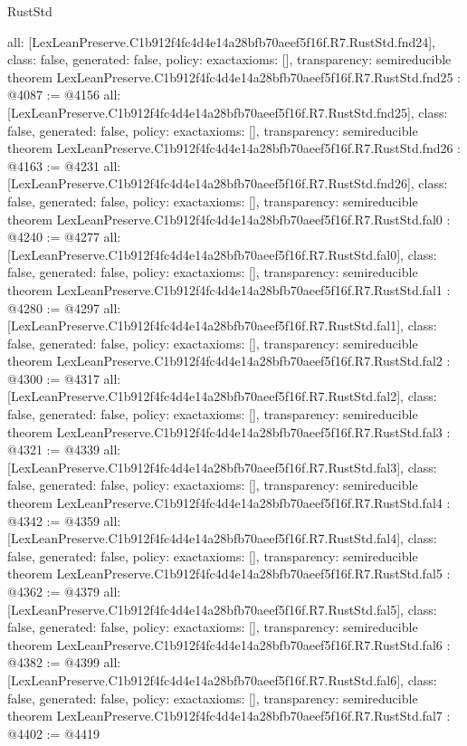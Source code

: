 \begin{lexlean}{RustStd}
\begin{coremodule}
{  all: [LexLeanPreserve.C1b912f4fc4d4e14a28bfb70aeef5f16f.R7.RustStd.fnd24],
  class: false,
  generated: false,
  policy: exact{axioms: []},
  transparency: semireducible
}
theorem LexLeanPreserve.C1b912f4fc4d4e14a28bfb70aeef5f16f.R7.RustStd.fnd25 : @4087 := @4156 {
  all: [LexLeanPreserve.C1b912f4fc4d4e14a28bfb70aeef5f16f.R7.RustStd.fnd25],
  class: false,
  generated: false,
  policy: exact{axioms: []},
  transparency: semireducible
}
theorem LexLeanPreserve.C1b912f4fc4d4e14a28bfb70aeef5f16f.R7.RustStd.fnd26 : @4163 := @4231 {
  all: [LexLeanPreserve.C1b912f4fc4d4e14a28bfb70aeef5f16f.R7.RustStd.fnd26],
  class: false,
  generated: false,
  policy: exact{axioms: []},
  transparency: semireducible
}
theorem LexLeanPreserve.C1b912f4fc4d4e14a28bfb70aeef5f16f.R7.RustStd.fal0 : @4240 := @4277 {
  all: [LexLeanPreserve.C1b912f4fc4d4e14a28bfb70aeef5f16f.R7.RustStd.fal0],
  class: false,
  generated: false,
  policy: exact{axioms: []},
  transparency: semireducible
}
theorem LexLeanPreserve.C1b912f4fc4d4e14a28bfb70aeef5f16f.R7.RustStd.fal1 : @4280 := @4297 {
  all: [LexLeanPreserve.C1b912f4fc4d4e14a28bfb70aeef5f16f.R7.RustStd.fal1],
  class: false,
  generated: false,
  policy: exact{axioms: []},
  transparency: semireducible
}
theorem LexLeanPreserve.C1b912f4fc4d4e14a28bfb70aeef5f16f.R7.RustStd.fal2 : @4300 := @4317 {
  all: [LexLeanPreserve.C1b912f4fc4d4e14a28bfb70aeef5f16f.R7.RustStd.fal2],
  class: false,
  generated: false,
  policy: exact{axioms: []},
  transparency: semireducible
}
theorem LexLeanPreserve.C1b912f4fc4d4e14a28bfb70aeef5f16f.R7.RustStd.fal3 : @4321 := @4339 {
  all: [LexLeanPreserve.C1b912f4fc4d4e14a28bfb70aeef5f16f.R7.RustStd.fal3],
  class: false,
  generated: false,
  policy: exact{axioms: []},
  transparency: semireducible
}
theorem LexLeanPreserve.C1b912f4fc4d4e14a28bfb70aeef5f16f.R7.RustStd.fal4 : @4342 := @4359 {
  all: [LexLeanPreserve.C1b912f4fc4d4e14a28bfb70aeef5f16f.R7.RustStd.fal4],
  class: false,
  generated: false,
  policy: exact{axioms: []},
  transparency: semireducible
}
theorem LexLeanPreserve.C1b912f4fc4d4e14a28bfb70aeef5f16f.R7.RustStd.fal5 : @4362 := @4379 {
  all: [LexLeanPreserve.C1b912f4fc4d4e14a28bfb70aeef5f16f.R7.RustStd.fal5],
  class: false,
  generated: false,
  policy: exact{axioms: []},
  transparency: semireducible
}
theorem LexLeanPreserve.C1b912f4fc4d4e14a28bfb70aeef5f16f.R7.RustStd.fal6 : @4382 := @4399 {
  all: [LexLeanPreserve.C1b912f4fc4d4e14a28bfb70aeef5f16f.R7.RustStd.fal6],
  class: false,
  generated: false,
  policy: exact{axioms: []},
  transparency: semireducible
}
theorem LexLeanPreserve.C1b912f4fc4d4e14a28bfb70aeef5f16f.R7.RustStd.fal7 : @4402 := @4419 {
}
\end{coremodule}
\end{lexlean}

